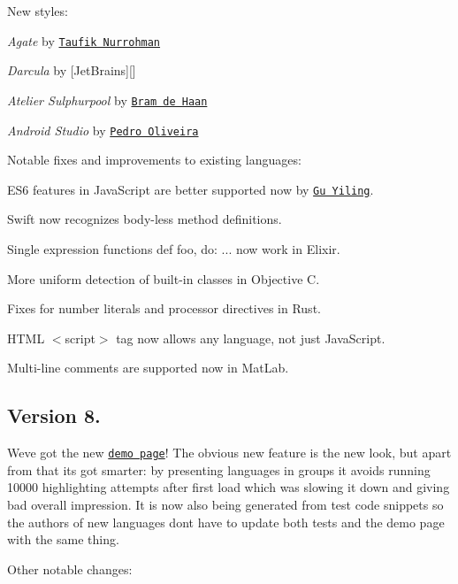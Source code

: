 New styles\+:


\begin{DoxyItemize}
\item {\itshape Agate} by \href{https://github.com/tovic}{\tt Taufik Nurrohman}
\item {\itshape Darcula} by \mbox{[}Jet\+Brains\mbox{]}\mbox{[}\mbox{]}
\item {\itshape Atelier Sulphurpool} by \href{https://github.com/atelierbram}{\tt Bram de Haan}
\item {\itshape Android Studio} by \href{https://github.com/kanytu}{\tt Pedro Oliveira}
\end{DoxyItemize}

Notable fixes and improvements to existing languages\+:


\begin{DoxyItemize}
\item E\+S6 features in Java\+Script are better supported now by \href{https://github.com/Justineo}{\tt Gu Yiling}.
\item Swift now recognizes body-\/less method definitions.
\item Single expression functions {\ttfamily def foo, do\+: ...} now work in Elixir.
\item More uniform detection of built-\/in classes in Objective C.
\item Fixes for number literals and processor directives in Rust.
\item H\+T\+ML {\ttfamily $<$script$>$} tag now allows any language, not just Java\+Script.
\item Multi-\/line comments are supported now in Mat\+Lab.
\end{DoxyItemize}

\subsection*{Version 8.}

We\textquotesingle{}ve got the new \href{https://highlightjs.org/static/demo/}{\tt demo page}! The obvious new feature is the new look, but apart from that it\textquotesingle{}s got smarter\+: by presenting languages in groups it avoids running 10000 highlighting attempts after first load which was slowing it down and giving bad overall impression. It is now also being generated from test code snippets so the authors of new languages don\textquotesingle{}t have to update both tests and the demo page with the same thing.

Other notable changes\+:



